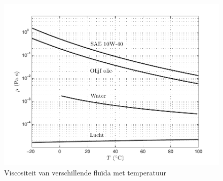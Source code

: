 \begin{figure}[htb]
	\centering
	\includegraphics{fig/basisbegrippen/Dynamische_viscositeit_temperatuur.pdf}
	\caption{Viscositeit van verschillende flu\"ida met temperatuur}
	\label{fig:dynamische viscositeit temperatuur}
\end{figure}

	\FloatBarrier
